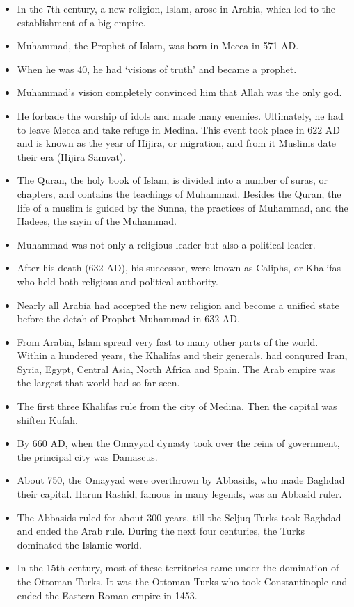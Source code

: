 \documentclass[
  openany]{book}
\providecommand{\tightlist}{%
  \setlength{\itemsep}{0pt}\setlength{\parskip}{0pt}}
\begin{document}
\begin{itemize}
\tightlist
\item
  In the 7th century, a new religion, Islam, arose in Arabia, which led to the establishment of a big empire.
\item
  Muhammad, the Prophet of Islam, was born in Mecca in 571 AD.
\item
  When he was 40, he had `visions of truth' and became a prophet.
\item
  Muhammad's vision completely convinced him that Allah was the only god.
\item
  He forbade the worship of idols and made many enemies. Ultimately, he had to leave Mecca and take refuge in Medina. This event took place in 622 AD and is known as the year of Hijira, or migration, and from it Muslims date their era (Hijira Samvat).
\item
  The Quran, the holy book of Islam, is divided into a number of suras, or chapters, and contains the teachings of Muhammad. Besides the Quran, the life of a muslim is guided by the Sunna, the practices of Muhammad, and the Hadees, the sayin of the Muhammad.
\item
  Muhammad was not only a religious leader but also a political leader.
\item
  After his death (632 AD), his successor, were known as Caliphs, or Khalifas who held both religious and political authority.
\item
  Nearly all Arabia had accepted the new religion and become a unified state before the detah of Prophet Muhammad in 632 AD.
\item
  From Arabia, Islam spread very fast to many other parts of the world. Within a hundered years, the Khalifas and their generals, had conqured Iran, Syria, Egypt, Central Asia, North Africa and Spain. The Arab empire was the largest that world had so far seen.
\item
  The first three Khalifas rule from the city of Medina. Then the capital was shiften Kufah.
\item
  By 660 AD, when the Omayyad dynasty took over the reins of government, the principal city was Damascus.
\item
  About 750, the Omayyad were overthrown by Abbasids, who made Baghdad their capital. Harun Rashid, famous in many legends, was an Abbasid ruler.
\item
  The Abbasids ruled for about 300 years, till the Seljuq Turks took Baghdad and ended the Arab rule. During the next four centuries, the Turks dominated the Islamic world.
\item
  In the 15th century, most of these territories came under the domination of the Ottoman Turks. It was the Ottoman Turks who took Constantinople and ended the Eastern Roman empire in 1453.
\end{itemize}
\end{document}
